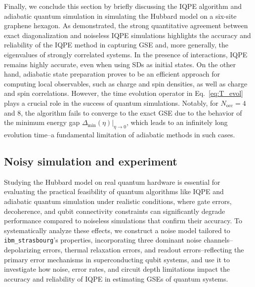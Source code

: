 \documentclass[twocolumn,superscriptaddress,amsmath,amssymb,showpacs,floatfix,preprintnumbers]{revtex4-1}
\newcommand{\mr}{\mathrm}
\newcommand{\ibmstr}{\texttt{ibm\_strasbourg}}
\begin{document}
Finally, we conclude this section by briefly discussing the IQPE algorithm and adiabatic quantum 
simulation in simulating the Hubbard model on a six-site graphene hexagon.
%
As demonstrated, the strong quantitative agreement between exact diagonalization
and noiseless IQPE simulations highlights the accuracy and reliability of the IQPE method in capturing
GSE and, more generally, the eigenvalues of strongly correlated systems. 
%
In the presence of interactions, IQPE remains highly accurate, even when using SDs as initial states.
%
On the other hand, adiabatic state preparation proves to be an efficient approach for computing local
observables, such as charge and spin densities, as well as charge and spin correlations. 
%
However, the time evolution operator in Eq.~\eqref{eq:T_evol} plays a crucial role in the success 
of quantum simulations. 
%
Notably, for $N_\mr{occ} = 4$ and $8$, the algorithm fails to converge to the exact GSE due to the behavior 
of the minimum energy gap $\Delta_\mr{min} (\eta)|_{\eta \rightarrow 0}$, which leads to an infinitely 
long evolution time--a fundamental limitation of adiabatic methods in such cases.

\subsection{Noisy simulation and experiment} \label{ss_noisy}
Studying the Hubbard model on real quantum hardware is essential for evaluating the practical
feasibility of quantum algorithms like IQPE and adiabatic quantum simulation under realistic
conditions, where gate errors, decoherence, and qubit connectivity constraints can significantly
degrade performance compared to noiseless simulations that confirm their accuracy. 
%
To systematically analyze these effects, we construct a noise model tailored to \ibmstr's
properties, incorporating three dominant noise channels--depolarizing errors, thermal relaxation 
errors, and readout errors--reflecting the primary error mechanisms in superconducting qubit systems,
and use it to investigate how noise, error rates, and circuit depth limitations impact the accuracy
and reliability of IQPE in estimating GSEs of quantum systems.
\end{document}
